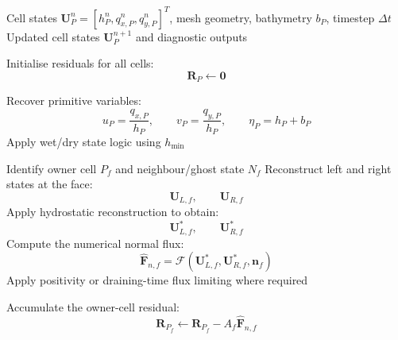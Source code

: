\documentclass[11pt]{article}
\begin{document}
\tableofcontents
\newpage
{}

\begin{algorithm}[h!]
  \caption{Face-Based Finite-Volume Solver Loop for a General Shallow-Water Mesh}
  \label{alg:fv_solver_loop}
  \begin{algorithmic}[1]
      \Require Cell states $\mathbf{U}_P^n = [h_P^n, q_{x,P}^n, q_{y,P}^n]^T$, mesh geometry, bathymetry $b_P$, timestep $\Delta t$
      \Ensure Updated cell states $\mathbf{U}_P^{n+1}$ and diagnostic outputs

      \State Initialise residuals for all cells:
      \[
          \mathbf{R}_P \gets \mathbf{0}
          \label{eq:init_residual}
      \]

          \State Recover primitive variables:
          \[
              u_P =
              \frac{q_{x,P}}{h_P},
              \qquad
              v_P =
              \frac{q_{y,P}}{h_P},
              \qquad
              \eta_P =
              h_P + b_P
              \label{eq:primitive_recovery_algorithm}
          \]
          \State Apply wet/dry state logic using $h_{\min}$
      \EndFor

          \State Identify owner cell $P_f$ and neighbour/ghost state $N_f$
          \State Reconstruct left and right states at the face:
          \[
              \mathbf{U}_{L,f},
              \qquad
              \mathbf{U}_{R,f}
              \label{eq:face_reconstructed_states}
          \]
          \State Apply hydrostatic reconstruction to obtain:
          \[
              \mathbf{U}_{L,f}^{*},
              \qquad
              \mathbf{U}_{R,f}^{*}
              \label{eq:hydrostatic_reconstructed_states_algorithm}
          \]
          \State Compute the numerical normal flux:
          \[
              \widehat{\mathbf{F}}_{n,f}
              =
              \mathcal{F}
              \left(
                  \mathbf{U}_{L,f}^{*},
                  \mathbf{U}_{R,f}^{*},
                  \mathbf{n}_f
              \right)
              \label{eq:numerical_normal_flux_algorithm}
          \]
          \State Apply positivity or draining-time flux limiting where required

          \State Accumulate the owner-cell residual:
          \[
              \mathbf{R}_{P_f}
              \gets
              \mathbf{R}_{P_f}
              -
              A_f\widehat{\mathbf{F}}_{n,f}
              \label{eq:owner_residual_update_algorithm}
          \]


\end{algorithmic}
\end{algorithm}
\end{document}
